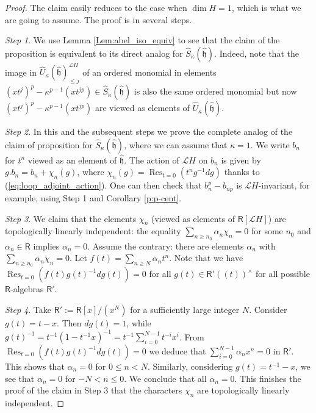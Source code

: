 \documentclass{amsart}
\theoremstyle{definition}
\newcommand{\Ring}{\mathsf{R}}
\newcommand{\h}{\mathfrak{h}}
\newcommand{\hh}{\hat{\mathfrak{h}}}
\newcommand{\Loop}{\mathscr{L}}
\numberwithin{equation}{section}
\begin{document}
\begin{proof}
The claim easily reduces to the case when $\dim H=1$, which is what we are going to assume. 
The proof is in several steps. 

{\it Step 1}. We use Lemma \ref{Lem:abel_iso_equiv} 
to see that the claim of the proposition is equivalent to its direct analog for $\widehat{S}_\kappa(\hh)$. Indeed, note that the image in  $\widehat{U}_\kappa(\hat{\h})^{\Loop H}_{\leqslant j}$ of an ordered monomial in elements  $(xt^j)^p-\kappa^{p-1}(xt^{jp})\in \widehat{S}_\kappa(\hh)$ is also the same ordered monomial but now 
$(xt^j)^p-\kappa^{p-1}(xt^{jp})$ are viewed as elements of $\widehat{U}_\kappa(\hh)$.

{\it Step 2}. In this and the subsequent steps we prove the complete analog of the claim of proposition for $\widehat{S}_\kappa(\hh)$, where we can assume that $\kappa=1$.
We write $b_n$ for $t^n$ viewed as an element of $\hh$. The action of $\Loop H$ on $b_n$ is given by $g.b_n=b_n +\chi_n(g)$, where $\chi_n(g)=\operatorname{Res}_{t=0}(t^n g^{-1}dg)$ thanks to (\ref{eq:loop_adjoint_action}). One can then check that $b_n^p-b_{np}$ is $\Loop H$-invariant, for example, using Step 1 and Corollary \ref{p:p-cent}.

{\it Step 3}. We claim that the elements $\chi_n$ (viewed as elements of $\Ring[\Loop H]$) are topologically linearly independent: the equality $\sum_{n\geqslant n_0}\alpha_n\chi_n=0$ for some $n_0$ and $\alpha_n\in \Ring$ implies $\alpha_n=0$.
Assume the contrary: there are elements $\alpha_n$ with 
$\sum_{n\geqslant n_0}\alpha_n\chi_n=0$. Let $f(t)=\sum_{n\geqslant N}\alpha_n t^n$.  Note that we have $\operatorname{Res}_{t=0}(f(t)g(t)^{-1}dg(t))=0$ for all $g(t)\in \Ring'(\!(t)\!)^\times$ for all possible $\Ring$-algebras $\Ring'$. 

{\it Step 4}. Take $\Ring':=\Ring[x]/(x^N)$ for a  sufficiently large integer $N$. 
Consider $g(t)=t-x$. Then $dg(t)=1$, while 
$g(t)^{-1}=t^{-1}(1-t^{-1}x)^{-1}=t^{-1}\sum_{i=0}^{N-1}t^{-i}x^i$. From $\operatorname{Res}_{t=0}(f(t)g(t)^{-1}dg(t))=0$
we deduce that $\sum_{i=0}^{N-1}\alpha_n x^n=0$ in $\Ring'$.
This shows that $\alpha_n=0$ for $0\leqslant n<N$. Similarly, considering $g(t)=t^{-1}-x$, we see that
$\alpha_n=0$ for $-N<n\leqslant 0$. We conclude that all 
$\alpha_n=0$. This finishes the proof of the claim in
Step 3 that the characters $\chi_n$ are topologically linearly independent. 


\end{proof}
\end{document}
